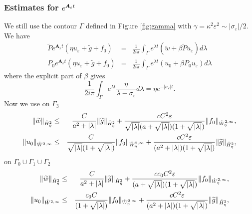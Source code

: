 \documentclass[11pt]{article}
\begin{document}
\subsubsection{Estimates for $e^{\boldsymbol{A}_{\protect\varepsilon }t}$}

We still use the contour $\Gamma $ defined in Figure \ref{fig:gamma}
with $\gamma =\kappa ^{2}\varepsilon ^{2}\sim |\sigma _{\varepsilon }|/2.$
We have  
\begin{eqnarray*}
\widetilde{P}e^{\boldsymbol{A}_{\varepsilon }t}(\eta u_{\varepsilon }+%
\widetilde{g}+f_{0}) &=&\frac{1}{2i\pi }\int_{\Gamma }e^{\lambda t}\left( 
\widetilde{w}+\beta \widetilde{P}u_{\varepsilon }\right) d\lambda \\
P_{0}e^{\boldsymbol{A}_{\varepsilon }t}(\eta u_{\varepsilon }+\widetilde{g}%
+f_{0}) &=&\frac{1}{2i\pi }\int_{\Gamma }e^{\lambda t}(u_{0}+\beta
P_{0}u_{\varepsilon })d\lambda
\end{eqnarray*}%
where the explicit part of $\beta $ gives 
\begin{equation}
\frac{1}{2i\pi }\int_{\Gamma }e^{\lambda t}\frac{\eta }{\lambda -\sigma
_{\varepsilon }}d\lambda =\eta e^{-|\sigma _{\varepsilon }|t}.
\label{estim integ beta}
\end{equation}%
Now we use on $\Gamma_3$%
\begin{eqnarray*}
\|\widetilde{w}\|_{\mathring{H}_{\eta}^{2}} &\leq &\frac{C}{a^{2}+|\lambda |}\|%
\widetilde{g}\|_{\mathring{H}_{\eta}^{2}}+\frac{cC^{2}\varepsilon }{\sqrt{%
|\lambda |}(a+\sqrt{|\lambda |})(1 +\sqrt{|\lambda |})}%
\|f_{0}\|_{\mathring{W}_{\eta}^{2,\infty }}, 
\\
\|u_{0}\|_{\mathring{W}^{2,\infty }} &\leq &\frac{C}{\sqrt{|\lambda |}%
(1 +\sqrt{|\lambda |})}\|f_{0}\|_{\mathring{W}%
_{\eta}^{2,\infty }}+\frac{cC^{2}\varepsilon }{(a^{2}+|\lambda |)(1 +\sqrt{|\lambda |})}\|\widetilde{g}\|_{\mathring{H}_{\eta}^{2}},
\end{eqnarray*}%
on $\Gamma_0 \cup \Gamma_1 \cup \Gamma_2$
\begin{eqnarray*}
\|\widetilde{w}\|_{\mathring{H}_{\eta}^{2}} &\leq &\frac{C}{a^{2}+|\lambda |}\|%
\widetilde{g}\|_{\mathring{H}_{\eta}^{2}}+\frac{c c_0 C^{2}\varepsilon }{(a+\sqrt{|\lambda |})(1 +\sqrt{|\lambda |})}%
\|f_{0}\|_{\mathring{W}_{\eta}^{2,\infty }}, 
\\
\|u_{0}\|_{\mathring{W}^{2,\infty }} &\leq &\frac{c_0 C}{%
(1 +\sqrt{|\lambda |})}\|f_{0}\|_{\mathring{W}%
_{\eta}^{2,\infty }}+\frac{c C^{2}\varepsilon }{(a^{2}+|\lambda |)(1 +\sqrt{|\lambda |})}\|\widetilde{g}\|_{\mathring{H}_{\eta}^{2}},
\end{eqnarray*}%
\end{document}
